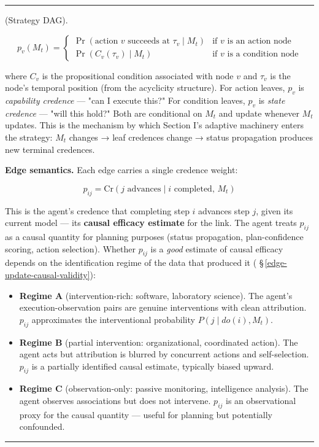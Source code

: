 \documentclass[11pt,oneside]{article}
\newcounter{claim}[section]
\renewcommand{\theclaim}{\thesection.\arabic{claim}}
\newenvironment{segment}[2]{%
  \refstepcounter{claim}%
  \bigskip\noindent\hrule\smallskip
  \noindent{\bfseries #1~\theclaim}\enskip(#2).\par\smallskip
  \noindent\ignorespaces
}{%
  \par\smallskip\noindent\hrule\bigskip
}
\newenvironment{definition}[1][]{\begin{segment}{Definition}{#1}}{\end{segment}}
\begin{document}
\begin{definition}[Strategy DAG]
$$p_v(M_t) = \begin{cases} \Pr(\text{action } v \text{ succeeds at } \tau_v \mid M_t) & \text{if } v \text{ is an action node} \\[4pt] \Pr(C_v(\tau_v) \mid M_t) & \text{if } v \text{ is a condition node} \end{cases}$$

where $C_v$ is the propositional condition associated with node $v$ and $\tau_v$ is the node's temporal position (from the acyclicity structure). For action leaves, $p_v$ is \textit{capability credence} — "can I execute this?" For condition leaves, $p_v$ is \textit{state credence} — "will this hold?" Both are conditional on $M_t$ and update whenever $M_t$ updates. This is the mechanism by which Section I's adaptive machinery enters the strategy: $M_t$ changes → leaf credences change → status propagation produces new terminal credences.

\textbf{Edge semantics.} Each edge carries a single credence weight:

$$p_{ij} = \text{Cr}(j \text{ advances} \mid i \text{ completed},\, M_t)$$

This is the agent's credence that completing step $i$ advances step $j$, given its current model --- its \textbf{causal efficacy estimate} for the link. The agent treats $p_{ij}$ as a causal quantity for planning purposes (status propagation, plan-confidence scoring, action selection). Whether $p_{ij}$ is a \textit{good} estimate of causal efficacy depends on the identification regime of the data that produced it ( \S\,\ref{edge-update-causal-validity}):

\begin{itemize}
  \item \textbf{Regime A} (intervention-rich: software, laboratory science). The agent's execution-observation pairs are genuine interventions with clean attribution. $p_{ij}$ approximates the interventional probability $P(j \mid do(i), M_t)$.
  \item \textbf{Regime B} (partial intervention: organizational, coordinated action). The agent acts but attribution is blurred by concurrent actions and self-selection. $p_{ij}$ is a partially identified causal estimate, typically biased upward.
  \item \textbf{Regime C} (observation-only: passive monitoring, intelligence analysis). The agent observes associations but does not intervene. $p_{ij}$ is an observational proxy for the causal quantity --- useful for planning but potentially confounded.
\end{itemize}



\end{definition}
\end{document}
